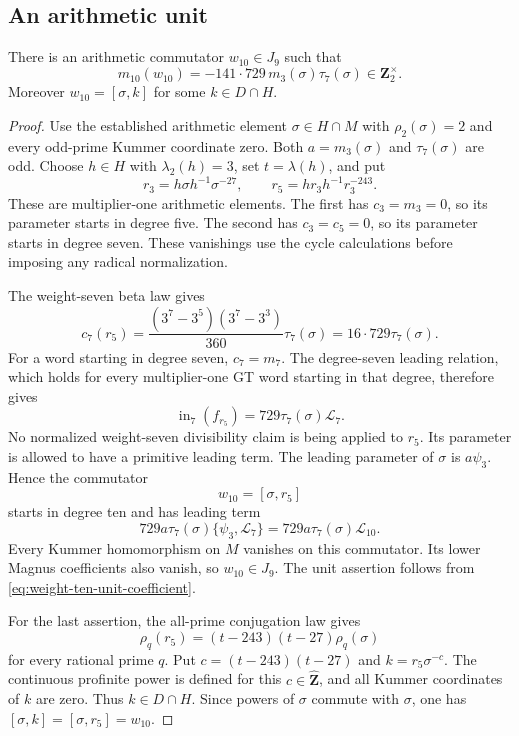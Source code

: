 \subsection{An arithmetic unit}

\begin{lemma}\label{lem:weight-ten-arithmetic-unit}
There is an arithmetic commutator $w_{10}\in J_9$ such that
\[
 m_{10}(w_{10})=-141\cdot729\,m_3(\sigma)\tau_7(\sigma)
                                  \in\mathbf Z_2^\times.
\]
Moreover $w_{10}=[\sigma,k]$ for some $k\in D\cap H$.
\end{lemma}

\begin{proof}
Use the established arithmetic element $\sigma\in H\cap M$ with
$\rho_2(\sigma)=2$ and every odd-prime Kummer coordinate zero.
Both $a=m_3(\sigma)$ and $\tau_7(\sigma)$ are odd. Choose
$h\in H$ with $\lambda_2(h)=3$, set $t=\lambda(h)$, and put
\[
 r_3=h\sigma h^{-1}\sigma^{-27},\qquad
 r_5=h r_3h^{-1}r_3^{-243}.
\]
These are multiplier-one arithmetic elements. The first has
$c_3=m_3=0$, so its parameter starts in degree five. The second
has $c_3=c_5=0$, so its parameter starts in degree seven. These
vanishings use the cycle calculations before imposing any radical
normalization.

The weight-seven beta law gives
\[
 c_7(r_5)=\frac{(3^7-3^5)(3^7-3^3)}{360}\tau_7(\sigma)
        =16\cdot729\tau_7(\sigma).
\]
For a word starting in degree seven, $c_7=m_7$. The degree-seven
leading relation, which holds for every multiplier-one GT word
starting in that degree, therefore gives
\[
 \operatorname{in}_7(f_{r_5})=729\tau_7(\sigma)\mathcal L_7.
\]
No normalized weight-seven divisibility claim is being applied to
$r_5$. Its parameter is allowed to have a primitive leading term.
The leading parameter of $\sigma$ is $a\psi_3$. Hence the
commutator
\[
 w_{10}=[\sigma,r_5]
\]
starts in degree ten and has leading term
\[
 729a\tau_7(\sigma)\{\psi_3,\mathcal L_7\}
       =729a\tau_7(\sigma)\mathcal L_{10}.
\]
Every Kummer homomorphism on $M$ vanishes on this commutator. Its
lower Magnus coefficients also vanish, so $w_{10}\in J_9$.
The unit assertion follows from
\eqref{eq:weight-ten-unit-coefficient}.

For the last assertion, the all-prime conjugation law gives
\[
 \rho_q(r_5)=(t-243)(t-27)\rho_q(\sigma)
\]
for every rational prime $q$. Put $c=(t-243)(t-27)$ and
$k=r_5\sigma^{-c}$. The continuous profinite power is defined for
this $c\in\widehat{\mathbf Z}$, and all Kummer coordinates of $k$
are zero. Thus $k\in D\cap H$. Since powers of $\sigma$ commute
with $\sigma$, one has $[\sigma,k]=[\sigma,r_5]=w_{10}$.
\end{proof}

